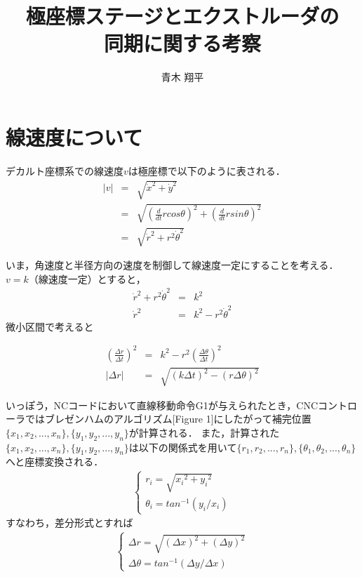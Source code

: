 \documentclass[twocolumn,oneside,a4paper]{article}
\title{極座標ステージとエクストルーダの\\同期に関する考察}
\author{青木 翔平}
\begin{document}
\maketitle

\section{線速度について}
デカルト座標系での線速度$v$は極座標で以下のように表される．
\begin{eqnarray}
|v| &=& \sqrt{\dot{x}^2 + \dot{y}^2} \nonumber \\
  &=& \sqrt{ \left(\frac{d}{dt} r cos\theta \right) ^2 + \left(\frac{d}{dt}r sin\theta\right) ^2} \nonumber \\
  &=& \sqrt{ \dot{r}^2+ r^2 \dot{\theta}^2 } 
\end{eqnarray}	
	
いま，角速度と半径方向の速度を制御して線速度一定にすることを考える．
$v=k$（線速度一定）とすると，
\begin{eqnarray*}
  \dot{r}^2+ r^2 \dot{\theta}^2 &=& k^2 \\
  \dot{r}^2 &=&  k^2 - r^2 \dot{\theta}^2 
\end{eqnarray*}
微小区間で考えると

\begin{eqnarray}
	\left( \frac{\Delta r}{\Delta t}\right)^2 &=&  k^2 - r^2 \left( \frac{\Delta \theta}{\Delta t}\right)^2 \nonumber \\
|\Delta r| &=& \sqrt{(k \Delta t)^2 - (r \Delta \theta)^2}
\end{eqnarray}

いっぽう，NCコードにおいて直線移動命令G1が与えられたとき，CNCコントローラではブレゼンハムのアルゴリズム[Figure 1]にしたがって補完位置$\{x_1,x_2,...,x_n\},\{y_1,y_2,...,y_n\}$が計算される．
また，計算された$\{x_1,x_2,...,x_n\},\{y_1,y_2,...,y_n\}$は以下の関係式を用いて$\{r_1,r_2,...,r_n\},\{\theta_1,\theta_2,...,\theta_n\}$へと座標変換される．　
\begin{eqnarray*}
\left\{
  \begin{array}{ll}
r_i = \sqrt{{x_i}^2+{y_i}^2} \\	
\theta_i = tan^{-1} (y_i / x_i)
  \end{array}
  \right.
\end{eqnarray*}
すなわち，差分形式とすれば
\begin{eqnarray}
\left\{
  \begin{array}{ll}
\Delta r = \sqrt{(\Delta x)^2+(\Delta y)^2} \\	
\Delta \theta = tan^{-1} (\Delta y / \Delta x)
  \end{array}
  \right. 
\end{eqnarray}
\end{document}
